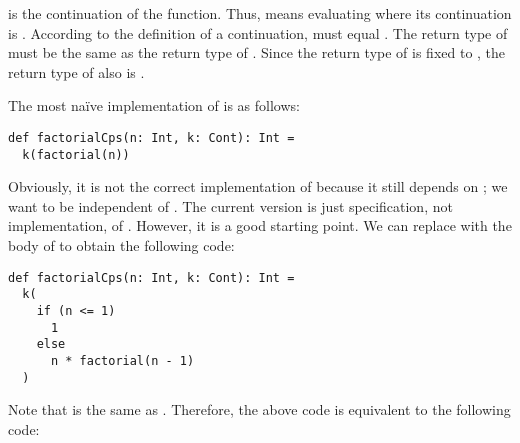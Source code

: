  is the continuation of the function. Thus,
 means evaluating  where its
continuation is . According to the definition of a continuation,
 must equal .
The return type of  must be the same as the return type of
. Since the return type of  is fixed to , the return
type of  also is .



The most naïve implementation of  is as follows:

\begin{verbatim}
def factorialCps(n: Int, k: Cont): Int =
  k(factorial(n))
\end{verbatim}

Obviously, it is not the correct implementation of  because
it still depends on ; we want  to be
independent of .
The current version is just specification, not implementation, of .
However, it is a good starting point. We can replace  with
the body of  to obtain the following code:

\begin{verbatim}
def factorialCps(n: Int, k: Cont): Int =
  k(
    if (n <= 1)
      1
    else
      n * factorial(n - 1)
  )
\end{verbatim}

Note that  is the same as . Therefore, the above code is equivalent to the following code:

